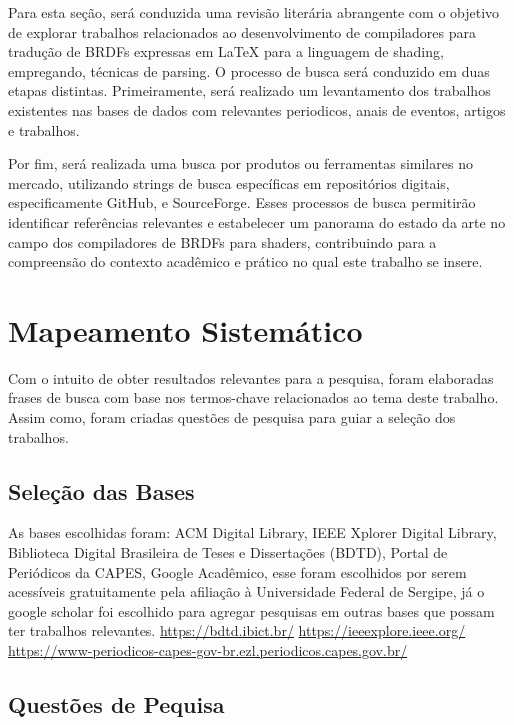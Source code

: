 \documentclass[english, 
               brazil, 
               bsc] %
               {dcomp-abntex2}
\begin{document}
Para esta seção, será conduzida uma revisão literária abrangente com o objetivo de explorar trabalhos relacionados ao desenvolvimento de compiladores para tradução de BRDFs expressas em LaTeX para a linguagem de shading, empregando, técnicas de parsing. O processo de busca será conduzido em duas etapas distintas. Primeiramente, será realizado um levantamento dos trabalhos existentes nas bases de dados  com relevantes periodicos, anais de eventos, artigos e trabalhos. 


Por fim, será realizada uma busca por produtos ou ferramentas similares no mercado, utilizando strings de busca específicas em repositórios digitais, especificamente GitHub, e SourceForge. Esses processos de busca permitirão identificar referências relevantes e estabelecer um panorama do estado da arte no campo dos compiladores de BRDFs  para shaders, contribuindo para a compreensão do contexto acadêmico e prático no qual este trabalho se insere.

\section{Mapeamento Sistemático}

Com o intuito de obter resultados relevantes para a pesquisa, foram elaboradas frases de busca com base nos termos-chave relacionados ao tema deste trabalho. Assim como, foram criadas questões de pesquisa para guiar a seleção dos trabalhos.

\subsection{Seleção das Bases}
As bases escolhidas foram: ACM Digital Library,  IEEE Xplorer Digital Library,  Biblioteca Digital Brasileira de Teses e Dissertações (BDTD), Portal de Periódicos da CAPES,  Google Acadêmico, esse foram escolhidos por serem acessíveis gratuitamente pela afiliação à Universidade Federal de Sergipe, já o google scholar foi escolhido para agregar pesquisas em outras bases que possam ter trabalhos relevantes.
\url{https://bdtd.ibict.br/}
\url{https://ieeexplore.ieee.org/}
\url{https://www-periodicos-capes-gov-br.ezl.periodicos.capes.gov.br/}



\subsection{Questões de Pequisa} \label{sec:questoes-pesquisa}
\end{document}
